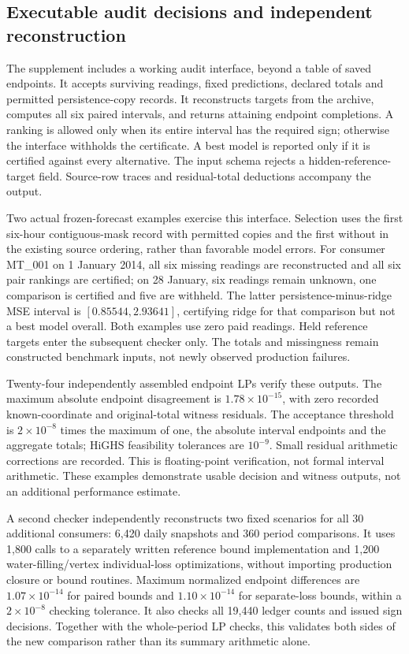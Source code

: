 \subsection{Executable audit decisions and independent reconstruction}
\label{sec:executable-gate}
The supplement includes a working audit interface, beyond a table of saved
endpoints. It accepts surviving readings, fixed predictions, declared
totals and permitted persistence-copy records. It reconstructs targets
from the archive, computes all six paired intervals, and returns attaining
endpoint completions. A ranking is allowed only when its entire interval
has the required sign; otherwise the interface withholds the certificate.
A best model is reported only if it is certified against every alternative.
The input schema rejects a hidden-reference-target field. Source-row traces
and residual-total deductions accompany the output.

Two actual frozen-forecast examples exercise this interface. Selection
uses the first six-hour contiguous-mask record with permitted copies and
the first without in the existing source ordering, rather than favorable
model errors. For consumer MT\_001 on 1 January 2014, all six missing
readings are reconstructed and all six pair rankings are certified; on
28 January, six readings remain unknown, one comparison is certified and
five are withheld. The latter persistence-minus-ridge MSE interval is
$[0.85544,2.93641]$, certifying ridge for that comparison but not a best
model overall. Both examples use zero paid readings. Held reference targets
enter the subsequent checker only. The totals and missingness remain
constructed benchmark inputs, not newly observed production failures.

Twenty-four independently assembled endpoint LPs verify these outputs.
The maximum absolute endpoint disagreement is $1.78\times10^{-15}$,
with zero recorded known-coordinate and original-total witness residuals.
The acceptance threshold is $2\times10^{-8}$ times the maximum of one,
the absolute interval endpoints and the aggregate totals; HiGHS feasibility
tolerances are $10^{-9}$. Small residual arithmetic corrections are recorded.
This is floating-point verification,
not formal interval arithmetic. These examples demonstrate usable
decision and witness outputs, not an additional performance estimate.

A second checker independently reconstructs two fixed scenarios for all
30 additional consumers: 6,420 daily snapshots and 360 period comparisons.
It uses 1,800 calls to a separately written reference bound implementation
and 1,200 water-filling/vertex individual-loss optimizations, without
importing production closure or bound routines. Maximum normalized
endpoint differences are $1.07\times10^{-14}$ for paired bounds and
$1.10\times10^{-14}$ for separate-loss bounds, within a $2\times10^{-8}$
checking tolerance. It also checks all 19,440 ledger counts and issued
sign decisions. Together with the whole-period LP checks, this validates
both sides of the new comparison rather than its summary arithmetic alone.
\FloatBarrier
